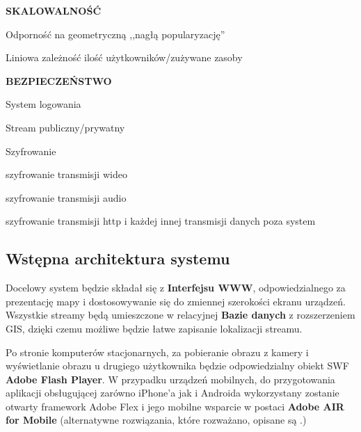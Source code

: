 \begin{packed_item}
{\begin{packed_item}
        \end{packed_item}
    }
    \item{
        \textbf{SKALOWALNOŚĆ}
        \begin{packed_item}
            \item{Odporność na geometryczną ,,nagłą popularyzację''}
            \item{Liniowa zależność ilość użytkowników/zużywane zasoby}
        \end{packed_item}
    }
    \item{
        \textbf{BEZPIECZEŃSTWO}
        \begin{packed_item}
            \item{
                System logowania
            }
            \item{
                Stream publiczny/prywatny
            }
            \item{
                Szyfrowanie
                \begin{packed_item}
                    \item{szyfrowanie transmisji wideo}
                    \item{szyfrowanie transmisji audio}
                    \item{szyfrowanie transmisji http i każdej innej transmisji danych poza system}
                \end{packed_item}
            }
        \end{packed_item}
    }
\end{packed_item}

\subsection{Wstępna architektura systemu}
\label{sec:EtapIwstepnaArchitekturaSystemu}

Docelowy system będzie składał się z \textbf{Interfejsu WWW}, odpowiedzialnego za prezentację mapy i dostosowywanie się do zmiennej szerokości ekranu urządzeń. Wszystkie streamy będą umieszczone w relacyjnej \textbf{Bazie danych} z rozszerzeniem GIS, dzięki czemu możliwe będzie łatwe zapisanie lokalizacji streamu.

Po stronie komputerów stacjonarnych, za pobieranie obrazu z kamery i wyświetlanie obrazu u drugiego użytkownika będzie odpowiedzialny obiekt SWF \textbf{Adobe Flash Player}. W przypadku urządzeń mobilnych, do przygotowania aplikacji obsługującej zarówno iPhone'a jak i Androida wykorzystany zostanie otwarty framework Adobe Flex i jego mobilne wsparcie w postaci \textbf{Adobe AIR for Mobile} (alternatywne rozwiązania, które rozważano, opisane są .)

